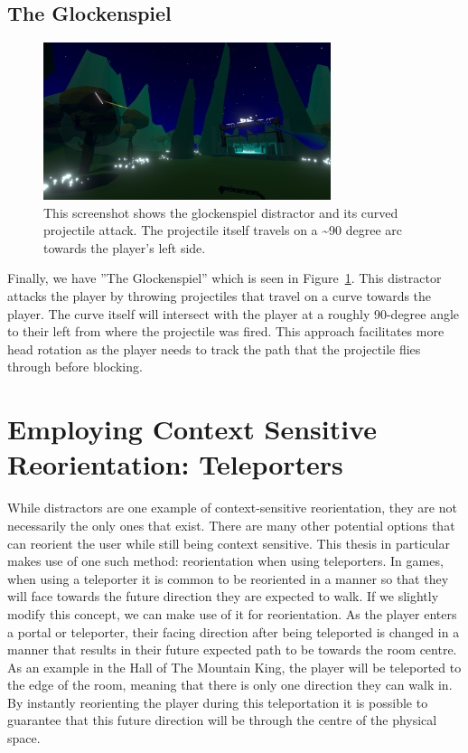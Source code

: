 \subsection{The Glockenspiel}
\begin{figure}[tbph]
    \centering
    \includegraphics[width=0.75\textwidth]{figures/screenshots/glockenspiel.png}
    \caption[The Glockenspiel Distractor]{This screenshot shows the glockenspiel distractor and its curved projectile attack. The projectile itself travels on a \textasciitilde90 degree arc towards the player's left side.}
    \label{fig:glockenspielDistractor}
\end{figure}
Finally, we have ''The Glockenspiel'' which is seen in Figure~\ref{fig:glockenspielDistractor}. This distractor attacks the player by throwing projectiles that travel on a curve towards the player. The curve itself will intersect with the player at a roughly 90-degree angle to their left from where the projectile was fired. This approach facilitates more head rotation as the player needs to track the path that the projectile flies through before blocking. 

\section{Employing Context Sensitive Reorientation: Teleporters}
While distractors are one example of context-sensitive reorientation, they are not necessarily the only ones that exist. There are many other potential options that can reorient the user while still being context sensitive. This thesis in particular makes use of one such method: reorientation when using teleporters. In games, when using a teleporter it is common to be reoriented in a manner so that they will face towards the future direction they are expected to walk. If we slightly modify this concept, we can make use of it for reorientation. As the player enters a portal or teleporter, their facing direction after being teleported is changed in a manner that results in their future expected path to be towards the room centre. As an example in the Hall of The Mountain King, the player will be teleported to the edge of the room, meaning that there is only one direction they can walk in. By instantly reorienting the player during this teleportation it is possible to guarantee that this future direction will be through the centre of the physical space. 

